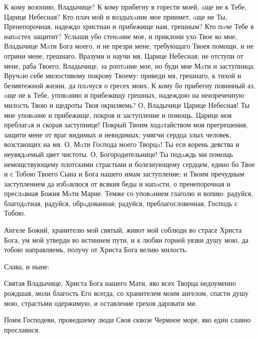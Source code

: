 К кому возопию, Владычице? К кому прибегну в горести моей, aще не к Тебе, Царице Небесная? Кто плач мой и воздыхaние мое приимет, aще не Ты, Пренепорочная, надеждо христиан и прибежище нам, грешным? Кто пaче Тебе в напaстех защитит? Услыши убо стенaние мое, и приклони ухо Твое ко мне, Владычице Мaти Бога моего, и не презри мене, требующаго Твоея помощи, и не отрини мене, грешнаго. Вразуми и научи мя, Царице Небесная; не отступи от мене, раба Твоего, Владычице, за роптaние мое, но буди мне Мaти и заступница. Вручaю себе милостивому покрову Твоему: приведи мя, грешнаго, к тихой и безмятежной жизни, да плaчуся о гресех моих. К кому бо прибегну повинный аз, aще не к Тебе, уповaнию и прибежищу грешных, надеждою на неизреченную милость Твою и щедроты Твоя окриляемь? О, Владычице Царице Небесная! Ты мне уповaние и прибежище, покров и заступление и помощь. Царице моя преблагaя и скорая заступнице! Покрый Твоим ходaтайством моя прегрешения, защити мене от враг видимых и невидимых; умягчи сердца злых человек, возстающих на мя. О, Мaти Господа моего Творцa! Ты еси корень девства и неувядaемый цвет чистоты. О, Богородительнице! Ты подaждь ми помощь немощствующему плотскими страстьми и болезнующему сердцем, едино бо Твое и с Тобою Твоего Сына и Бога нашего имам заступление; и Твоим пречудным заступлением да избaвлюся от всякия беды и напaсти, о пренепорочная и преслaвная Божия Мaти Марие. Темже со уповaнием глаголю и вопию: радуйся, благодaтная, радуйся, обрaдованная; радуйся, преблагословенная, Господь с Тобою.\mychapterending

 

Ангеле Божий, хранителю мой святый, живот мой соблюди во страсе Христа Бога, ум мой утверди во истиннем пути, и к любви горней уязви душу мою, да тобою направляемь, получу от Христа Бога велию милость.


Слава, и ныне:

\medskip
Святая Владычице, Христа Бога нашего Мати, яко всех Творца недоуменно рождшая, моли благость Его всегда, со хранителем моим ангелом, спасти душу мою, страстьми одержимую, и оставление грехов даровати ми.


\medskip



\medskip



  Поим Господеви, проведшему люди Своя сквозе Чермное море, яко един славно прославися.


